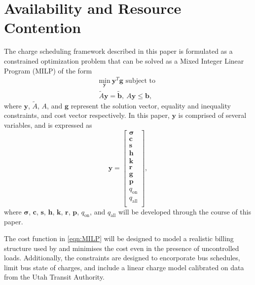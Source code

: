 \section{Availability and Resource Contention\label{sec:4_formulation}}
The charge scheduling framework described in this paper is formulated as a constrained optimization problem that can be solved as a Mixed Integer Linear Program (MILP) of the form
\begin{equation}\label{eqn:MILP}\begin{matrix}
	\underset{\mathbf{y}}{\text{min}} \ \mathbf{y}^T\mathbf{g} \text{ subject to } \\
	\tilde{A}\mathbf{y} = \tilde{\mathbf{b}}, \ A\mathbf{y} \le \mathbf{b},
\end{matrix} \end{equation}
where $\mathbf{y}$, $\tilde{A}$, $A$, and $\mathbf{g}$ represent the solution vector, equality and inequality constraints, and cost vector respectively. In this paper, $\mathbf{y}$ is comprised of several variables, and is expressed as 
\begin{equation}\label{eqn:yDef}
	\mathbf{y} = \begin{bmatrix}
			\boldsymbol{\sigma} \\ 
			\mathbf{c}      \\ 
			\mathbf{s}      \\ 
			\mathbf{h}      \\ 
			\mathbf{k}      \\ 
			\mathbf{r}      \\ 
			\mathbf{g}      \\
			\mathbf{p}      \\ 
			q_{\text{on}}   \\ 
			q_{\text{all}}  \\
		     \end{bmatrix},
\end{equation}
where $\boldsymbol{\sigma}$, $\mathbf{c}$, $\mathbf{s}$, $\mathbf{h}$, $\mathbf{k}$, $\mathbf{r}$, $\mathbf{p}$, $q_{\text{on}}$, and $q_{\text{all}}$ will be developed through the course of this paper.
\par The cost function in \eqref{eqn:MILP} will be designed to model a realistic billing structure used by \cite{rocky_mountain_power_rocky_2021} and minimises the cost even in the presence of uncontrolled loads. Additionally, the constraints are designed to encorporate bus schedules, limit bus state of charges, and include a linear charge model calibrated on data from the Utah Transit Authority.
